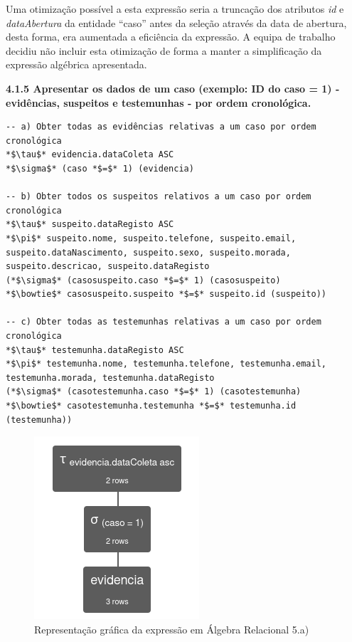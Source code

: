 \documentclass[a4paper,12pt]{scrreprt}
\begin{document}
Uma otimização possível a esta expressão seria a truncação dos atributos \textit{id} e \textit{dataAbertura} da entidade “caso” antes da seleção através da data de abertura, desta forma, era aumentada a eficiência da expressão. A equipa de trabalho decidiu não incluir esta otimização de forma a manter a simplificação da expressão algébrica apresentada. 

\clearpage %
{\large\textbf{4.1.5 Apresentar os dados de um caso (exemplo: ID do caso = 1) - evidências, suspeitos e testemunhas - por ordem cronológica.}}

\vspace{0.2cm}
\begin{lstlisting}[escapechar=*]
-- a) Obter todas as evidências relativas a um caso por ordem cronológica
*$\tau$* evidencia.dataColeta ASC
*$\sigma$* (caso *$=$* 1) (evidencia)

-- b) Obter todos os suspeitos relativos a um caso por ordem cronológica
*$\tau$* suspeito.dataRegisto ASC
*$\pi$* suspeito.nome, suspeito.telefone, suspeito.email, suspeito.dataNascimento, suspeito.sexo, suspeito.morada, suspeito.descricao, suspeito.dataRegisto
(*$\sigma$* (casosuspeito.caso *$=$* 1) (casosuspeito)
*$\bowtie$* casosuspeito.suspeito *$=$* suspeito.id (suspeito))

-- c) Obter todas as testemunhas relativas a um caso por ordem cronológica
*$\tau$* testemunha.dataRegisto ASC
*$\pi$* testemunha.nome, testemunha.telefone, testemunha.email, testemunha.morada, testemunha.dataRegisto
(*$\sigma$* (casotestemunha.caso *$=$* 1) (casotestemunha)
*$\bowtie$* casotestemunha.testemunha *$=$* testemunha.id (testemunha))
\end{lstlisting}

\begin{figure}[!ht]
    \centering
    \includegraphics[scale=0.9]{images/relax/5-a.png}
    \caption{Representação gráfica da expressão em Álgebra Relacional 5.a)}
    \label{fig:4.5}
\end{figure}
\end{document}
